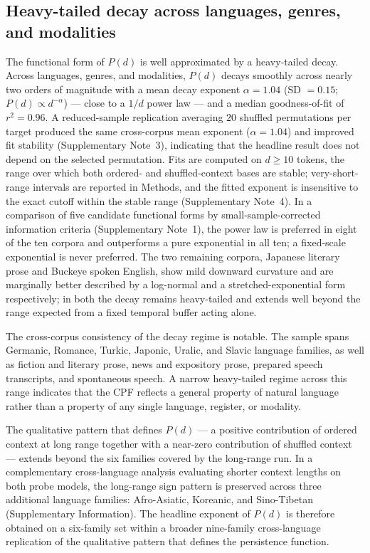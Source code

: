 \documentclass[11pt]{article}
\begin{document}
\subsection{Heavy-tailed decay across languages, genres, and modalities}

The functional form of $P(d)$ is well approximated by a heavy-tailed decay. Across
languages, genres, and modalities, $P(d)$ decays smoothly across nearly two orders of
magnitude with a mean decay exponent $\alpha=1.04$ (SD $=0.15$; $P(d)\propto d^{-\alpha}$)
--- close to a $1/d$ power law --- and a median goodness-of-fit of $r^2 = 0.96$. A
reduced-sample replication averaging $20$ shuffled permutations per target produced the same
cross-corpus mean exponent ($\alpha=1.04$) and improved fit stability (Supplementary Note~3),
indicating that the headline result does not depend on the selected permutation. Fits are computed on $d \geq 10$
tokens, the range over which both ordered- and shuffled-context bases are stable;
very-short-range intervals are reported in Methods, and the fitted exponent is insensitive to the
exact cutoff within the stable range (Supplementary Note~4). In a comparison of five candidate
functional forms by small-sample-corrected information criteria (Supplementary Note~1), the power law is preferred in eight of the ten corpora and outperforms a
pure exponential in all ten; a fixed-scale exponential is never preferred. The two
remaining corpora, Japanese literary prose and Buckeye spoken English, show mild downward
curvature and are marginally better described by a log-normal and a stretched-exponential
form respectively; in both the decay remains heavy-tailed and extends well beyond the range
expected from a fixed temporal buffer acting alone.

The cross-corpus consistency of the decay regime is notable. The sample spans
Germanic, Romance, Turkic, Japonic, Uralic, and Slavic language families, as well as
fiction and literary prose, news and expository prose, prepared speech transcripts,
and spontaneous speech. A narrow heavy-tailed regime across this range indicates that
the CPF reflects a general property of natural language rather than a
property of any single language, register, or modality.

The qualitative pattern that defines $P(d)$ --- a positive contribution of ordered
context at long range together with a near-zero contribution of shuffled context ---
extends beyond the six families covered by the long-range run. In a complementary
cross-language analysis evaluating shorter context lengths on both probe models, the
long-range sign pattern is preserved across three additional language families:
Afro-Asiatic, Koreanic, and Sino-Tibetan (Supplementary Information). The headline
exponent of $P(d)$ is therefore obtained on a six-family set within a broader nine-family
cross-language replication of the qualitative pattern that defines the persistence
function.
\end{document}
